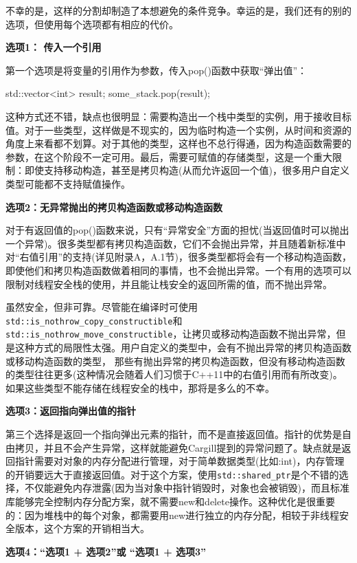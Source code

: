 不幸的是，这样的分割却制造了本想避免的条件竞争。幸运的是，我们还有的别的选项，但使用每个选项都有相应的代价。

\textbf{选项1： 传入一个引用}

第一个选项是将变量的引用作为参数，传入pop()函数中获取“弹出值”：

\begin{cpp}
std::vector<int> result;
some_stack.pop(result);
\end{cpp}

这种方式还不错，缺点也很明显：需要构造出一个栈中类型的实例，用于接收目标值。对于一些类型，这样做是不现实的，因为临时构造一个实例，从时间和资源的角度上来看都不划算。对于其他的类型，这样也不总行得通，因为构造函数需要的参数，在这个阶段不一定可用。最后，需要可赋值的存储类型，这是一个重大限制：即使支持移动构造，甚至是拷贝构造(从而允许返回一个值)，很多用户自定义类型可能都不支持赋值操作。

\textbf{选项2：无异常抛出的拷贝构造函数或移动构造函数}

对于有返回值的pop()函数来说，只有“异常安全”方面的担忧(当返回值时可以抛出一个异常)。很多类型都有拷贝构造函数，它们不会抛出异常，并且随着新标准中对“右值引用”的支持(详见附录A，A.1节)，很多类型都将会有一个移动构造函数，即使他们和拷贝构造函数做着相同的事情，也不会抛出异常。一个有用的选项可以限制对线程安全栈的使用，并且能让栈安全的返回所需的值，而不抛出异常。

虽然安全，但非可靠。尽管能在编译时可使用\texttt{std::is\_nothrow\_copy\_constructible}和\texttt{std::is\_nothrow\_move\_constructible}，让拷贝或移动构造函数不抛出异常，但是这种方式的局限性太强。用户自定义的类型中，会有不抛出异常的拷贝构造函数或移动构造函数的类型， 那些有抛出异常的拷贝构造函数，但没有移动构造函数的类型往往更多(这种情况会随着人们习惯于C++11中的右值引用而有所改变)。如果这些类型不能存储在线程安全的栈中，那将是多么的不幸。

\textbf{选项3：返回指向弹出值的指针}

第三个选择是返回一个指向弹出元素的指针，而不是直接返回值。指针的优势是自由拷贝，并且不会产生异常，这样就能避免Cargill提到的异常问题了。缺点就是返回指针需要对对象的内存分配进行管理，对于简单数据类型(比如:int)，内存管理的开销要远大于直接返回值。对于这个方案，使用\texttt{std::shared\_ptr}是个不错的选择，不仅能避免内存泄露(因为当对象中指针销毁时，对象也会被销毁)，而且标准库能够完全控制内存分配方案，就不需要new和delete操作。这种优化是很重要的：因为堆栈中的每个对象，都需要用new进行独立的内存分配，相较于非线程安全版本，这个方案的开销相当大。

\textbf{选项4：“选项1 + 选项2”或 “选项1 + 选项3”}

